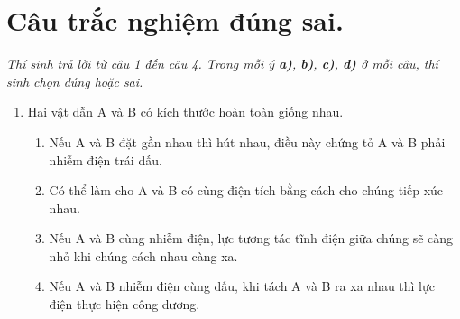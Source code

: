\section{Câu trắc nghiệm đúng sai.} 
\textit{Thí sinh trả lời từ câu 1 đến câu 4. Trong mỗi ý \textbf{a)}, \textbf{b)}, \textbf{c)}, \textbf{d)} ở mỗi câu, thí sinh chọn đúng hoặc sai.}
\begin{enumerate}[label=\bfseries Câu \arabic*:]
	\item Hai vật dẫn A và B có kích thước hoàn toàn giống nhau.
	\begin{enumerate}[label=\bfseries \alph*)]
		\item Nếu A và B đặt gần nhau thì hút nhau, điều này chứng tỏ A và B phải nhiễm điện trái dấu.
		\item Có thể làm cho A và B có cùng điện tích bằng cách cho chúng tiếp xúc nhau.
		\item Nếu A và B cùng nhiễm điện, lực tương tác tĩnh điện giữa chúng sẽ càng nhỏ khi chúng cách nhau càng xa.
		\item Nếu A và B nhiễm điện cùng dấu, khi tách A và B ra xa nhau thì lực điện thực hiện công dương.
	\end{enumerate}


\end{enumerate}
